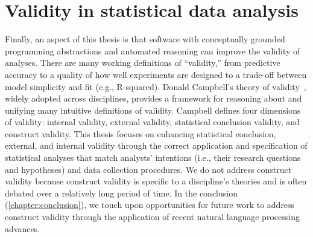 
\section{Validity in statistical data analysis}
Finally, an aspect of this thesis is that software with conceptually grounded
programming abstractions and automated reasoning can improve the validity of
analyses. There are many working definitions of ``validity,'' from predictive
accuracy to a quality of how well experiments are designed to a trade-off
between model simplicity and fit (e.g., R-squared). Donald Campbell's theory of
validity~\cite{shadish2010campbell}, widely adopted across disciplines, provides
a framework for reasoning about and unifying many intuitive definitions of
validity. Campbell defines four dimensions of validity: internal validity,
external validity, statistical conclusion validity, and construct validity. This
thesis focuses on enhancing statistical conclusion, external, and internal
validity through the correct application and specification of statistical
analyses that match analysts' intentions (i.e., their research questions and
hypotheses) and data collection procedures. We do not address construct validity
because construct validity is specific to a discipline's theories and is often
debated over a relatively long period of time. In the conclusion
(\autoref{chapter:conclusion}), we touch upon opportunities for future work to
address construct validity through the application of recent natural language
processing advances.


